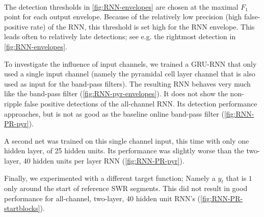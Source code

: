 \begin{figure}
\\[2.5em]
\label{fig:RNN-PR}
\end{figure}

The detection thresholds in \cref{fig:RNN-envelopes} are chosen at the maximal $F_1$ point for each output envelope. Because of the relatively low precision (high false-positive rate) of the RNN, this threshold is set high for the RNN envelope. This leads often to relatively late detections; see e.g. the rightmost detection in \cref{fig:RNN-envelopes}.

To investigate the influence of input channels, we trained a GRU-RNN that only used a single input channel (namely the pyramidal cell layer channel that is also used as input for the band-pass filters). The resulting RNN behaves very much like the band-pass filter (\cref{fig:RNN-pyr-envelopes}). It does not show the non-ripple false positive detections of the all-channel RNN. Its detection performance approaches, but is not as good as the baseline online band-pass filter (\cref{fig:RNN-PR-pyr}).

A second net was trained on this single channel input, this time with only one hidden layer, of 25 hidden units. Its performance was slightly worse than the two-layer, 40 hidden units per layer RNN (\cref{fig:RNN-PR-pyr}).

Finally, we experimented with a different target function; Namely a $y_t$ that is $1$ only around the start of reference SWR segments. This did not result in good performance for all-channel, two-layer, 40 hidden unit RNN's (\cref{fig:RNN-PR-startblocks}).
